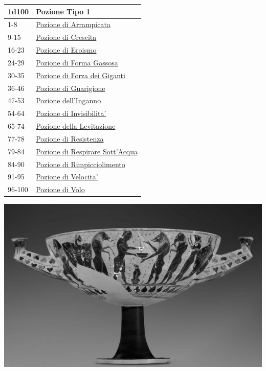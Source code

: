 \begin{multicols}{2}
{{\small\begin{tabularx}{\linewidth}{ll}
		\toprule
\rowcolor{gray!20}\textbf{1d100} & \textbf{Pozione Tipo 1}\\
\toprule
1-8 & \hyperlink{Pozione di Arrampicata}{Pozione di Arrampicata}\\
\rowcolor{gray!20}9-15 & \hyperlink{Pozione di Crescita}{Pozione di Crescita}\\
16-23 & \hyperlink{Pozione di Eroismo}{Pozione di Eroismo}\\
\rowcolor{gray!20}24-29 & \hyperlink{Pozione di FormaGassosa}{Pozione di Forma Gassosa}\\
30-35 & \hyperlink{Pozione di ForzadeiGiganti}{Pozione di Forza dei Giganti}\\
\rowcolor{gray!20}36-46 & \hyperlink{Pozione di Guarigione}{Pozione di Guarigione}\\
47-53 & \hyperlink{Pozione dell'Inganno}{Pozione dell'Inganno}\\
\rowcolor{gray!20}54-64 & \hyperlink{Pozione di Invisibilita'}{Pozione di Invisibilita'}\\
65-74 & \hyperlink{Pozione della Levitazione}{Pozione della Levitazione}\\
\rowcolor{gray!20}77-78 & \hyperlink{Pozione di Resistenza}{Pozione di Resistenza}\\
79-84 & \hyperlink{Pozione di RespirareSott'Acqua}{Pozione di Respirare Sott'Acqua}\\
\rowcolor{gray!20}84-90 & \hyperlink{Pozione di Rimpicciolimento}{Pozione di Rimpicciolimento}\\
91-95 & \hyperlink{Pozione di Velocita'}{Pozione di Velocita'}\\
\rowcolor{gray!20}96-100 & \hyperlink{Pozione di Volo}{Pozione di Volo}
\end{tabularx}}

\begin{center}
\includegraphics[width=0.8\linewidth]{immagini/cupdrinking.png}


\end{center}}
\end{multicols}
